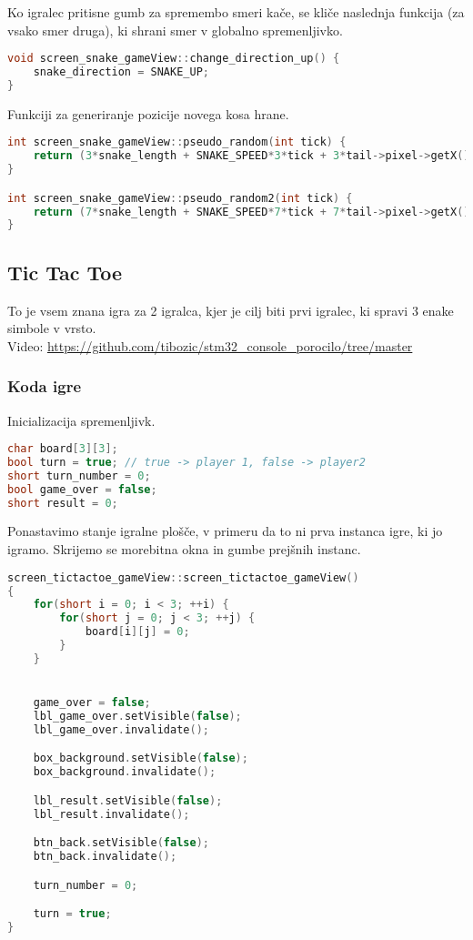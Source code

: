 \documentclass{article}
\begin{document}
\noindent
Ko igralec pritisne gumb za spremembo smeri ka\v{c}e, se kli\v{c}e
naslednja funkcija (za vsako smer druga), ki shrani smer v globalno
spremenljivko.
\begin{lstlisting}[language=c++]
void screen_snake_gameView::change_direction_up() {
	snake_direction = SNAKE_UP;
}
\end{lstlisting}

\noindent
Funkciji za generiranje pozicije novega kosa hrane.
\begin{lstlisting}[language=c++]
int screen_snake_gameView::pseudo_random(int tick) {
	return (3*snake_length + SNAKE_SPEED*3*tick + 3*tail->pixel->getX() * 3*tail->pixel->getY());
}

int screen_snake_gameView::pseudo_random2(int tick) {
	return (7*snake_length + SNAKE_SPEED*7*tick + 7*tail->pixel->getX() * 7*tail->pixel->getY());
}
\end{lstlisting}

\subsection{Tic Tac Toe}
\noindent
To je vsem znana igra za 2 igralca, kjer je cilj biti prvi igralec, ki
spravi 3 enake simbole v vrsto. \\
Video: \href{https://github.com/tibozic/stm32_console_porocilo/tree/master}{https://github.com/tibozic/stm32\_console\_porocilo/tree/master}

\subsubsection{Koda igre}
\noindent
Inicializacija spremenljivk.
\begin{lstlisting}[language=c++]
char board[3][3];
bool turn = true; // true -> player 1, false -> player2
short turn_number = 0;
bool game_over = false;
short result = 0;
\end{lstlisting}

\noindent
Ponastavimo stanje igralne plo\v{s}\v{c}e, v primeru da to ni prva
instanca igre, ki jo igramo. Skrijemo se morebitna okna in gumbe
prej\v{s}nih instanc.
\begin{lstlisting}[language=c++]
screen_tictactoe_gameView::screen_tictactoe_gameView()
{
    for(short i = 0; i < 3; ++i) {
        for(short j = 0; j < 3; ++j) {
            board[i][j] = 0;
        }
    }


    game_over = false;
    lbl_game_over.setVisible(false);
    lbl_game_over.invalidate();

    box_background.setVisible(false);
    box_background.invalidate();

    lbl_result.setVisible(false);
    lbl_result.invalidate();

    btn_back.setVisible(false);
    btn_back.invalidate();

    turn_number = 0;

    turn = true;
}
\end{lstlisting}
\end{document}
